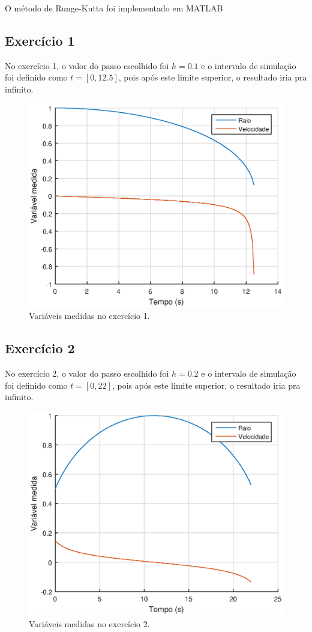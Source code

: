 \documentclass[10pt,a4paper]{article}
\begin{document}
	O método de Runge-Kutta foi implementado em MATLAB
	
	\subsection{Exercício 1}
	No exercício 1, o valor do passo escolhido foi $h=0.1$ e o intervalo de simulação foi definido como $t=[0,12.5]$, pois após este limite superior, o resultado iria pra infinito.    
    
    \begin{figure}[h!]
    \centering
      \includegraphics[width=0.8\linewidth]{figures/ex1h0-1t12-5.eps}
      \caption{Variáveis medidas no exercício 1.}
      \label{fig:ex1h0.1t12.5}
	\end{figure}
    
    \newpage
    \subsection{Exercício 2}
    
    No exercício 2, o valor do passo escolhido foi $h=0.2$ e o intervalo de simulação foi definido como $t=[0,22]$, pois após este limite superior, o resultado iria pra infinito.    
    
    \begin{figure}[h!]
    \centering
      \includegraphics[width=0.8\linewidth]{figures/ex2h0-2t22.eps}
      \caption{Variáveis medidas no exercício 2.}
      \label{fig:ex1h0.1t12.5}
	\end{figure}
    
\end{document}
